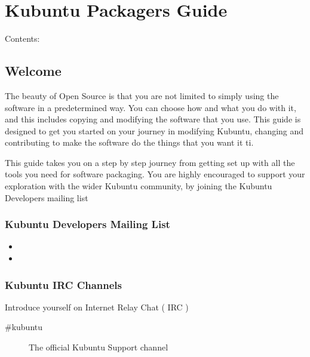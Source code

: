 \documentclass[letterpaper,10pt,english]{sphinxmanual}
\begin{document}
\chapter{Kubuntu Packagers Guide}
\label{\detokenize{docs/packaging_guide/packaging:kubuntu-packagers-guide}}\label{\detokenize{docs/packaging_guide/packaging::doc}}
Contents:


\section{Welcome}
\label{\detokenize{docs/packaging_guide/welcome:welcome}}\label{\detokenize{docs/packaging_guide/welcome:contribute-dev-link}}\label{\detokenize{docs/packaging_guide/welcome::doc}}
The beauty of Open Source is that you are not limited to simply using the software in a predetermined way. You can choose how and what you do with it, and this includes copying and modifying the software that you use.
This guide is designed to get you started on your journey in modifying Kubuntu, changing and contributing to make the software do the things that you want it ti.

This guide takes you on a step by step journey from getting set up with all the tools you need for software packaging. You are highly encouraged to support your exploration with the wider Kubuntu community, by joining the Kubuntu Developers mailing list


\subsection{Kubuntu Developers Mailing List}
\label{\detokenize{docs/packaging_guide/welcome:kubuntu-developers-mailing-list}}\begin{itemize}
\item {} 

\item {} 

\end{itemize}


\subsection{Kubuntu IRC Channels}
\label{\detokenize{docs/packaging_guide/welcome:kubuntu-irc-channels}}
Introduce yourself on Internet Relay Chat ( IRC )
\begin{description}
\item[{\#kubuntu}] \leavevmode
The official Kubuntu Support channel

\end{description}
\end{document}
